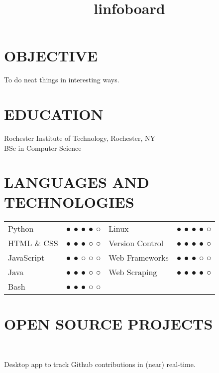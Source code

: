 \documentclass[line]{res}
\begin{document}

\address{131 Countess Drive\\West Henrietta, NY 14586}

\begin{resume}

\section{OBJECTIVE}
    To do neat things in interesting ways.

\section{EDUCATION}
    Rochester Institute of Technology, Rochester, NY \\
    BSc in Computer Science

\section{LANGUAGES AND TECHNOLOGIES}
    \begin{tabular}{l c l c}
        Python      & ● ● ● ● ○ & Linux           & ● ● ● ● ○ \\
        HTML \& CSS & ● ● ● ○ ○ & Version Control & ● ● ● ● ○ \\
        JavaScript  & ● ● ○ ○ ○ & Web Frameworks  & ● ● ● ○ ○ \\
        Java        & ● ● ● ○ ○ & Web Scraping    & ● ● ● ● ○ \\
        Bash        & ● ● ● ○ ○ \\
    \end{tabular}

\section{OPEN SOURCE PROJECTS}
    \begin{format}
        \title{l}\\
        \body
    \end{format}

    \title{infoboard}
    \begin{position}
        Desktop app to track Github contributions in (near) real-time.
    \end{position}


\end{resume}
\end{document}
